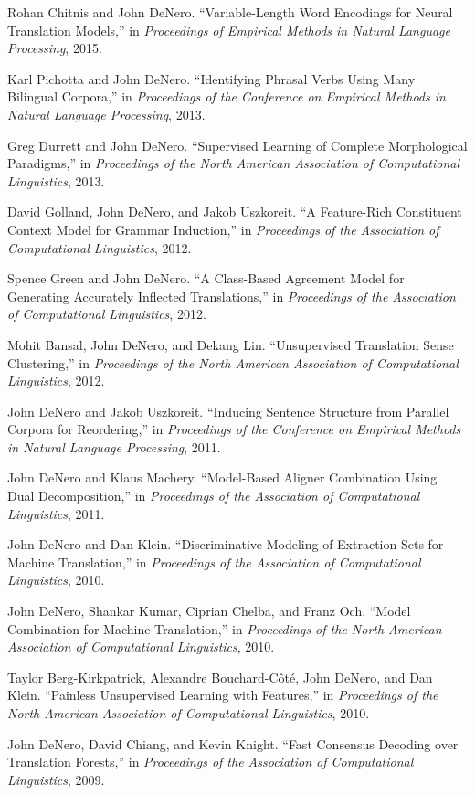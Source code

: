\documentclass[margin,line]{res}
\begin{document}
\begin{resume}
Rohan Chitnis and John DeNero. ``Variable-Length Word Encodings for Neural Translation Models,'' in {\it Proceedings of Empirical Methods in Natural Language Processing}, 2015.

Karl Pichotta and John DeNero.  ``Identifying Phrasal Verbs Using Many Bilingual Corpora,'' in {\it Proceedings of the Conference on Empirical Methods in Natural Language Processing}, 2013.

Greg Durrett and John DeNero.  ``Supervised Learning of Complete Morphological Paradigms,'' in {\it Proceedings of the North American Association of Computational Linguistics}, 2013.

David Golland, John DeNero, and Jakob Uszkoreit. ``A Feature-Rich Constituent Context Model for Grammar Induction,'' in {\it Proceedings of the Association of Computational Linguistics}, 2012.

Spence Green and John DeNero. ``A Class-Based Agreement Model for Generating Accurately Inflected Translations,'' in {\it Proceedings of the Association of Computational Linguistics}, 2012.

Mohit Bansal, John DeNero, and Dekang Lin. ``Unsupervised Translation Sense Clustering,'' in {\it Proceedings of the North American Association of Computational Linguistics}, 2012.

John DeNero and Jakob Uszkoreit.  ``Inducing Sentence Structure from Parallel Corpora for Reordering,'' in {\it Proceedings of the Conference on Empirical Methods in Natural Language Processing}, 2011.

John DeNero and Klaus Machery. ``Model-Based Aligner Combination Using Dual Decomposition,'' in {\it Proceedings of the Association of Computational Linguistics}, 2011.

John DeNero and Dan Klein. ``Discriminative Modeling of Extraction Sets for Machine Translation,'' in {\it Proceedings of the Association of Computational Linguistics}, 2010.

John DeNero, Shankar Kumar, Ciprian Chelba, and Franz Och. ``Model Combination for Machine Translation,'' in {\it Proceedings of the North American Association of Computational Linguistics}, 2010.

Taylor Berg-Kirkpatrick, Alexandre Bouchard-Côté, John DeNero, and Dan Klein. ``Painless Unsupervised Learning with Features,'' in {\it Proceedings of the North American Association of Computational Linguistics}, 2010.

John DeNero, David Chiang, and Kevin Knight. ``Fast Consensus Decoding over Translation Forests,'' in {\it Proceedings of the Association of Computational Linguistics}, 2009.


\end{resume}
\end{document}
